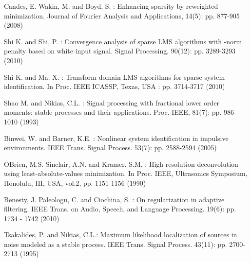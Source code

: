 \documentclass[conference]{IEEEtran}
\begin{document}
\begin{thebibliography}{00}
 Candes, E. Wakin, M. and Boyd, S. : Enhancing sparsity by reweighted  minimization. Journal of Fourier Analysis and Applications, 14(5): pp. 877-905 (2008)

 Shi K. and Shi, P. : Convergence analysis of sparse LMS algorithms with -norm penalty based on white input signal. Signal Processing, 90(12): pp. 3289-3293 (2010)

 Shi K. and Ma. X. : Transform domain LMS algorithms for sparse system identification. In Proc. IEEE ICASSP, Texas, USA : pp. 3714-3717 (2010)

 Shao M. and Nikias, C.L. : Signal processing with fractional lower order moments: stable processes and their applications. Proc. IEEE, 81(7): pp. 986-1010 (1993)

 Binwei, W.  and Barner, K.E. : Nonlinear system identification in impulsive environments. IEEE Trans. Signal Process. 53(7): pp. 2588-2594 (2005) 
 
 OBrien, M.S. Sinclair, A.N. and Kramer. S.M. : High resolution deconvolution using least-absolute-values minimization. In  Proc. IEEE, Ultrasonics Symposium, Honolulu, HI, USA, vol.2, pp. 1151-1156 (1990)

 Benesty, J. Paleologu, C. and Ciochina, S. : On regularization in adaptive filtering. IEEE Trans. on Audio, Speech,
and Language Processing. 19(6): pp. 1734 - 1742 (2010)

 Tsakalides, P. and Nikias, C.L.: Maximum likelihood localization of sources in noise modeled as a stable process. IEEE Trans. Signal Process. 43(11): pp. 2700-2713 (1995) 

\end{thebibliography}
\end{document}
